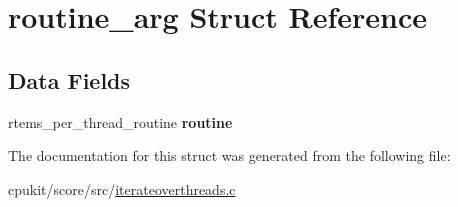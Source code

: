 \hypertarget{structroutine__arg}{}\section{routine\+\_\+arg Struct Reference}
\label{structroutine__arg}
\subsection*{Data Fields}
\begin{DoxyCompactItemize}
\item 
\mbox{\label{structroutine__arg_a9eb4dfdcb753248b9237cb79be9f342c}} 
rtems\+\_\+per\+\_\+thread\+\_\+routine {\bfseries routine}
\end{DoxyCompactItemize}


The documentation for this struct was generated from the following file\+:\begin{DoxyCompactItemize}
\item 
cpukit/score/src/\mbox{\hyperlink{iterateoverthreads_8c}{iterateoverthreads.\+c}}\end{DoxyCompactItemize}
